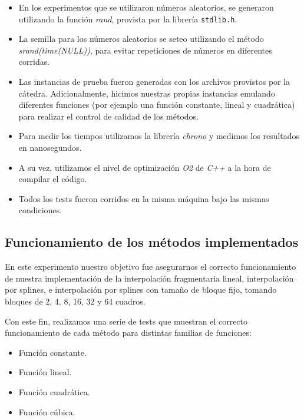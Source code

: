 \begin{itemize}
    \item En los experimentos que se utilizaron números aleatorios, se generaron utilizando la función \textit{rand}, provista por la librería \texttt{stdlib.h}.
    \item La semilla para los números aleatorios se seteo utilizando el método \textit{srand(time(NULL))}, para evitar repeticiones de números en diferentes corridas.
    \item Las instancias de prueba fueron generadas con los archivos provistos por la cátedra. Adicionalmente, hicimos nuestras propias instancias emulando diferentes funciones (por ejemplo una función constante, lineal y cuadrática) para realizar el control de calidad de los métodos.
    \item Para medir los tiempos utilizamos la librería \textit{chrono} y medimos los resultados en nanosegundos.
    \item A su vez, utilizamos el nivel de optimización \textit{O2} de \textit{C++} a la hora de compilar el código.
    \item Todos los tests fueron corridos en la misma máquina bajo las mismas condiciones.
\end{itemize}


\subsection{Funcionamiento de los métodos implementados}
En este experimento nuestro objetivo fue asegurarnos el correcto funcionamiento de nuestra implementación de la interpolación fragmentaria lineal, interpolación por splines, e interpolación por splines con tamaño de bloque fijo, tomando bloques de 2, 4, 8, 16, 32 y 64 cuadros.

Con este fin, realizamos una serie de tests que muestran el correcto funcionamiento de cada método para distintas familias de funciones:
\begin{itemize}
  \item Función constante.
  \item Función lineal.
  \item Función cuadrática.
  \item Función cúbica.
\end{itemize}

